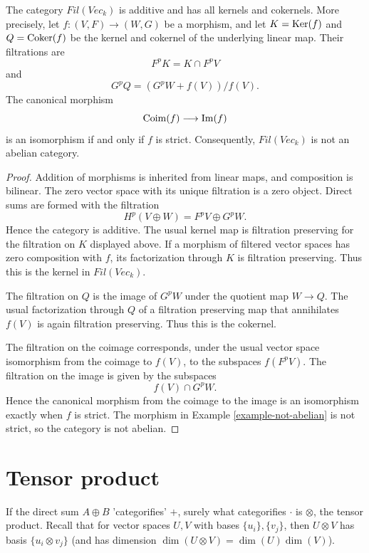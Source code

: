 \begin{lemma}
\label{lemma-filtered-vector-spaces}
The category $\mathit{Fil}(\mathit{Vec}_k)$
is additive and has all kernels and
cokernels. More precisely, let
$f : (V, F) \to (W, G)$ be a morphism, and
let $K = \mathop{\mathrm{Ker}}(f)$ and $Q = \mathop{\mathrm{Coker}}(f)$ be
the kernel and cokernel of the underlying
linear map. Their filtrations are
$$
F^pK=K\cap F^pV
$$
and
$$
G^pQ=(G^pW+f(V))/f(V).
$$
The canonical morphism
$$
\mathop{\mathrm{Coim}}(f)\longrightarrow\mathop{\mathrm{Im}}(f)
$$
is an isomorphism if and only if $f$ is
strict. Consequently,
$\mathit{Fil}(\mathit{Vec}_k)$ is not an
abelian category.
\end{lemma}

\begin{proof}
Addition of morphisms is inherited from
linear maps, and composition is bilinear.
The zero vector space with its unique
filtration is a zero object. Direct sums
are formed with the filtration
$$
H^p(V\oplus W)=F^pV\oplus G^pW.
$$
Hence the category is additive. The usual
kernel map is
filtration preserving for the filtration on
$K$ displayed above. If a morphism of
filtered vector spaces has zero composition
with $f$, its factorization through $K$ is
filtration preserving. Thus this is the
kernel in $\mathit{Fil}(\mathit{Vec}_k)$.

The filtration on $Q$ is the image of
$G^pW$ under the quotient map $W \to Q$.
The usual factorization through $Q$ of a
filtration preserving map that annihilates
$f(V)$ is again filtration preserving. Thus
this is the cokernel.

The filtration on the coimage corresponds,
under the usual vector space isomorphism
from the coimage to $f(V)$, to the subspaces
$f(F^pV)$. The filtration on the image is
given by the subspaces
$$
f(V)\cap G^pW.
$$
Hence the canonical morphism from the
coimage to the image is an isomorphism
exactly when $f$ is strict. The morphism in
Example \ref{example-not-abelian} is not
strict, so the category is not abelian.
\end{proof}

\section{Tensor product}
\label{section-tensor-product}

If the direct sum $A \oplus B$
'categorifies' $+$, surely what
categorifies $\cdot$ is $\otimes$,
the tensor product. Recall
that for vector spaces $U, V$
with bases $\{u_i\}, \{v_j\}$,
then $U \otimes V$ has basis
$\{u_i \otimes v_j\}$
(and has dimension $\dim(U \otimes V)
=\dim(U)\dim(V)$).

